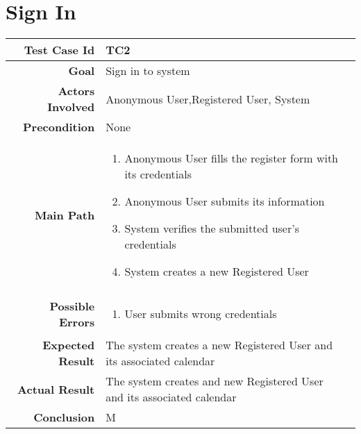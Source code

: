 \section{Sign In}
\begin{tabularx}{\linewidth}{|r|X|X|}

  \hline   {\bf Test Case Id} &  TC2\\
  \hline  {\bf Goal} & Sign in to system\\
  \hline  {\bf Actors Involved} & Anonymous User,Registered User, System\\
  \hline  {\bf Precondition} & None\\ 
   \hline  {\bf Main Path} & \begin{enumerate} 
   \item Anonymous User fills the register form with its credentials
   \item Anonymous User submits its information
   \item System verifies the submitted user's credentials
    \item System creates a new Registered User
   \end{enumerate}\\
   \hline  {\bf Possible Errors} & \begin{enumerate} 
   \item User submits wrong credentials 
   \end{enumerate}\\
  \hline  {\bf Expected Result} & The system creates a new Registered User and its associated calendar\\
  \hline  {\bf Actual Result} & The system creates and new Registered User and its associated calendar\\
  \hline  {\bf Conclusion} & M\\
  \hline
  
\end{tabularx}

